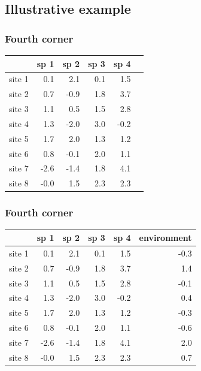 \documentclass{beamer}
\numberwithin{exercise}{section}
\begin{document}
\subsection{Illustrative example}

\begin{frame}
\frametitle{Fourth corner}
\small
\begin{table}[ht]
\begin{center}
\begin{tabular}{r|rrrr|r|}
  & sp 1 & sp 2 & sp 3 & sp 4 \\ 
  \hline
site 1 & 0.1 & 2.1 & 0.1 & 1.5  \\ 
  site 2 & 0.7 & -0.9 & 1.8 & 3.7  \\ 
  site 3 & 1.1 & 0.5 & 1.5 & 2.8  \\ 
  site 4 & 1.3 & -2.0 & 3.0 & -0.2  \\ 
  site 5 & 1.7 & 2.0 & 1.3 & 1.2  \\ 
  site 6 & 0.8 & -0.1 & 2.0 & 1.1  \\ 
  site 7 & -2.6 & -1.4 & 1.8 & 4.1  \\ 
  site 8 & -0.0 & 1.5 & 2.3 & 2.3  \\ 
   \hline
\end{tabular}
\end{center}
\end{table}\normalsize
\end{frame}

\begin{frame}
\frametitle{Fourth corner}
\small
\begin{table}[ht]
\begin{center}
\begin{tabular}{r|rrrr|r|}
  & sp 1 & sp 2 & sp 3 & sp 4 & environment \\ 
  \hline
site 1 & 0.1 & 2.1 & 0.1 & 1.5 & -0.3 \\ 
  site 2 & 0.7 & -0.9 & 1.8 & 3.7 & 1.4 \\ 
  site 3 & 1.1 & 0.5 & 1.5 & 2.8 & -0.1 \\ 
  site 4 & 1.3 & -2.0 & 3.0 & -0.2 & 0.4 \\ 
  site 5 & 1.7 & 2.0 & 1.3 & 1.2 & -0.3 \\ 
  site 6 & 0.8 & -0.1 & 2.0 & 1.1 & -0.6 \\ 
  site 7 & -2.6 & -1.4 & 1.8 & 4.1 & 2.0 \\ 
  site 8 & -0.0 & 1.5 & 2.3 & 2.3 & 0.7 \\ 
   \hline
\end{tabular}
\end{center}
\end{table}\normalsize
\end{frame}
\end{document}
